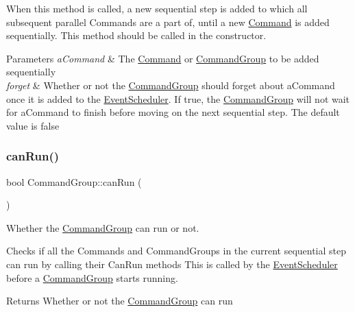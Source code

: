 When this method is called, a new sequential step is added to which all subsequent parallel Commands are a part of, until a new \mbox{\hyperlink{classlib_iterative_robot_1_1_command}{Command}} is added sequentially. This method should be called in the constructor.


\begin{DoxyParams}{Parameters}
{\em a\+Command} & The \mbox{\hyperlink{classlib_iterative_robot_1_1_command}{Command}} or \mbox{\hyperlink{classlib_iterative_robot_1_1_command_group}{Command\+Group}} to be added sequentially \\
\hline
{\em forget} & Whether or not the \mbox{\hyperlink{classlib_iterative_robot_1_1_command_group}{Command\+Group}} should forget about a\+Command once it is added to the \mbox{\hyperlink{classlib_iterative_robot_1_1_event_scheduler}{Event\+Scheduler}}. If true, the \mbox{\hyperlink{classlib_iterative_robot_1_1_command_group}{Command\+Group}} will not wait for a\+Command to finish before moving on the next sequential step. The default value is false \\
\hline
\end{DoxyParams}
\mbox{\label{classlib_iterative_robot_1_1_command_group_abd75c9b52e6b4ae5af1b6724e865311f}} 
\subsubsection{\texorpdfstring{canRun()}{canRun()}}
{\footnotesize\ttfamily bool Command\+Group\+::can\+Run (\begin{DoxyParamCaption}{ }\end{DoxyParamCaption})\hspace{0.3cm}{\ttfamily [virtual]}}



Whether the \mbox{\hyperlink{classlib_iterative_robot_1_1_command_group}{Command\+Group}} can run or not. 

Checks if all the Commands and Command\+Groups in the current sequential step can run by calling their Can\+Run methods This is called by the \mbox{\hyperlink{classlib_iterative_robot_1_1_event_scheduler}{Event\+Scheduler}} before a \mbox{\hyperlink{classlib_iterative_robot_1_1_command_group}{Command\+Group}} starts running. \begin{DoxyReturn}{Returns}
Whether or not the \mbox{\hyperlink{classlib_iterative_robot_1_1_command_group}{Command\+Group}} can run 
\end{DoxyReturn}


